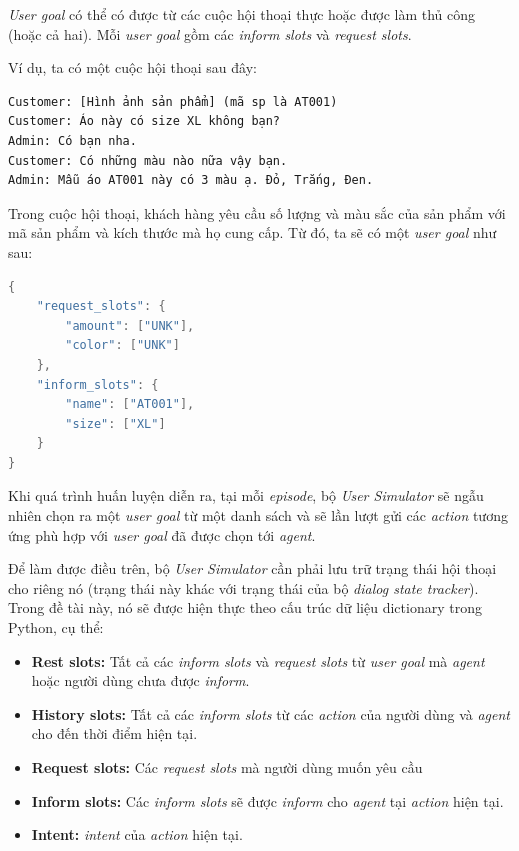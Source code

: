 \textit{User goal} có thể có được từ các cuộc hội thoại thực hoặc
được làm thủ công (hoặc cả hai). Mỗi \textit{user goal} gồm các
\textit{inform slots} và \textit{request slots}.

Ví dụ, ta có một cuộc hội thoại sau đây:

\begin{verbatim}
Customer: [Hình ảnh sản phẩm] (mã sp là AT001)
Customer: Áo này có size XL không bạn?
Admin: Có bạn nha.
Customer: Có những màu nào nữa vậy bạn.
Admin: Mẫu áo AT001 này có 3 màu ạ. Đỏ, Trắng, Đen.
\end{verbatim}

Trong cuộc hội thoại, khách hàng yêu cầu số lượng và màu sắc của sản phẩm với mã sản phẩm và kích thước mà họ cung cấp. Từ đó, ta sẽ có một \textit{user goal} như sau:

\begin{lstlisting}[language=Java]
{
    "request_slots": {
        "amount": ["UNK"],
        "color": ["UNK"]
    },
    "inform_slots": {
        "name": ["AT001"],
        "size": ["XL"]
    }
}
\end{lstlisting}

Khi quá trình huấn luyện diễn ra, tại mỗi \textit{episode}, bộ
\textit{User Simulator} sẽ ngẫu nhiên chọn ra một \textit{user goal}
từ một danh sách và sẽ lần lượt gửi các \textit{action} tương ứng
phù hợp với \textit{user goal} đã được chọn tới \textit{agent}.

Để làm được điều trên, bộ \textit{User Simulator} cần phải lưu trữ
trạng thái hội thoại cho riêng nó (trạng thái này khác với trạng thái
của bộ \textit{dialog state tracker}). Trong đề tài này, nó sẽ được
hiện thực theo cấu trúc dữ liệu dictionary trong Python, cụ thể:

\begin{itemize}
    \item \textbf{Rest slots:} Tất cả các \textit{inform slots} và
    \textit{request slots} từ \textit{user goal} mà \textit{agent}
    hoặc người dùng chưa được \textit{inform}.
    \item \textbf{History slots:} Tất cả các \textit{inform slots}
    từ các \textit{action} của người dùng và \textit{agent}
    cho đến thời điểm hiện tại.
    \item \textbf{Request slots:} Các \textit{request slots} mà
    người dùng muốn yêu cầu
    \item \textbf{Inform slots:} Các \textit{inform slots} sẽ được
    \textit{inform} cho \textit{agent} tại \textit{action} hiện tại.
    \item \textbf{Intent:} \textit{intent} của \textit{action} hiện tại.
\end{itemize}

